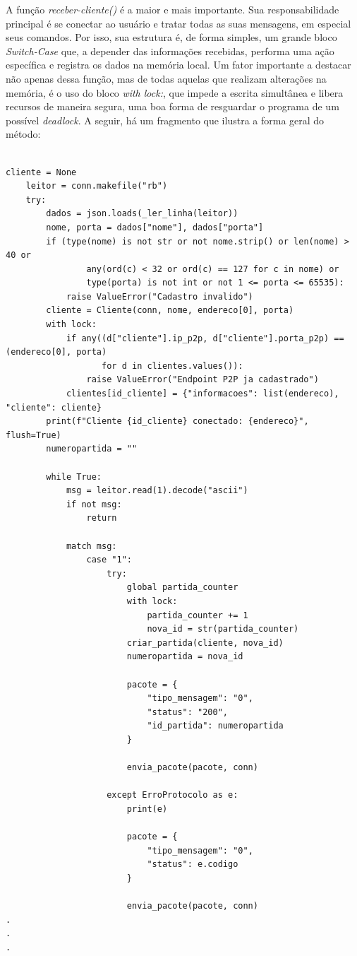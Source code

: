 \documentclass[11pt,a4paper]{article}
\begin{document}
A função \textit{receber-cliente()} é a maior e mais importante. Sua responsabilidade principal é se conectar ao usuário e tratar todas as suas mensagens, em especial seus comandos. Por isso, sua estrutura é, de forma simples, um grande bloco \textit{Switch-Case} que, a depender das informações recebidas, performa uma ação específica e registra os dados na memória local. Um fator importante a destacar não apenas dessa função, mas de todas aquelas que realizam alterações na memória, é o uso do bloco \textit{with lock:}, que impede a escrita simultânea e libera recursos de maneira segura, uma boa forma de resguardar o programa de um possível \textit{deadlock}. A seguir, há um fragmento que ilustra a forma geral do método:

\begin{verbatim}

cliente = None
    leitor = conn.makefile("rb")
    try:
        dados = json.loads(_ler_linha(leitor))
        nome, porta = dados["nome"], dados["porta"]
        if (type(nome) is not str or not nome.strip() or len(nome) > 40 or
                any(ord(c) < 32 or ord(c) == 127 for c in nome) or
                type(porta) is not int or not 1 <= porta <= 65535):
            raise ValueError("Cadastro invalido")
        cliente = Cliente(conn, nome, endereco[0], porta)
        with lock:
            if any((d["cliente"].ip_p2p, d["cliente"].porta_p2p) == (endereco[0], porta)
                   for d in clientes.values()):
                raise ValueError("Endpoint P2P ja cadastrado")
            clientes[id_cliente] = {"informacoes": list(endereco), "cliente": cliente}
        print(f"Cliente {id_cliente} conectado: {endereco}", flush=True)
        numeropartida = ""

        while True:
            msg = leitor.read(1).decode("ascii")
            if not msg:
                return

            match msg:
                case "1":
                    try:
                        global partida_counter
                        with lock:
                            partida_counter += 1
                            nova_id = str(partida_counter)
                        criar_partida(cliente, nova_id)
                        numeropartida = nova_id

                        pacote = {
                            "tipo_mensagem": "0",
                            "status": "200",
                            "id_partida": numeropartida
                        }

                        envia_pacote(pacote, conn)

                    except ErroProtocolo as e:
                        print(e)

                        pacote = {
                            "tipo_mensagem": "0",
                            "status": e.codigo
                        }

                        envia_pacote(pacote, conn)
.
.
.
\end{verbatim}
\end{document}
